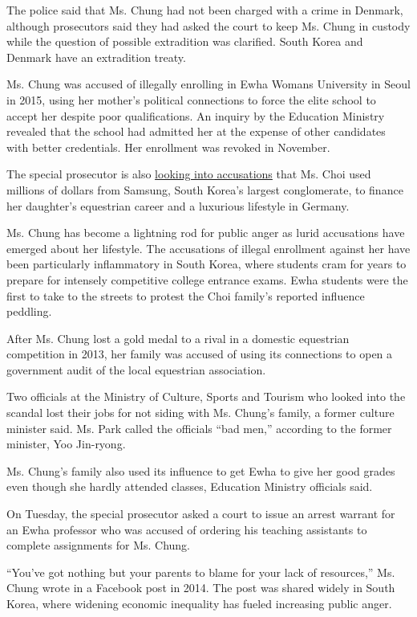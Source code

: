 The police said that Ms. Chung had not been charged with a crime in
Denmark, although prosecutors said they had asked the court to keep Ms.
Chung in custody while the question of possible extradition was
clarified. South Korea and Denmark have an extradition treaty.

Ms. Chung was accused of illegally enrolling in Ewha Womans University
in Seoul in 2015, using her mother's political connections to force the
elite school to accept her despite poor qualifications. An inquiry by
the Education Ministry revealed that the school had admitted her at the
expense of other candidates with better credentials. Her enrollment was
revoked in November.

The special prosecutor is also
\href{http://www.nytimes.com/2016/12/31/world/asia/south-korea-samsung-merger-moon-hyung-pyo.html}{looking
into accusations} that Ms. Choi used millions of dollars from Samsung,
South Korea's largest conglomerate, to finance her daughter's equestrian
career and a luxurious lifestyle in Germany.

Ms. Chung has become a lightning rod for public anger as lurid
accusations have emerged about her lifestyle. The accusations of illegal
enrollment against her have been particularly inflammatory in South
Korea, where students cram for years to prepare for intensely
competitive college entrance exams. Ewha students were the first to take
to the streets to protest the Choi family's reported influence peddling.

After Ms. Chung lost a gold medal to a rival in a domestic equestrian
competition in 2013, her family was accused of using its connections to
open a government audit of the local equestrian association.

Two officials at the Ministry of Culture, Sports and Tourism who looked
into the scandal lost their jobs for not siding with Ms. Chung's family,
a former culture minister said. Ms. Park called the officials ``bad
men,'' according to the former minister, Yoo Jin-ryong.

Ms. Chung's family also used its influence to get Ewha to give her good
grades even though she hardly attended classes, Education Ministry
officials said.

On Tuesday, the special prosecutor asked a court to issue an arrest
warrant for an Ewha professor who was accused of ordering his teaching
assistants to complete assignments for Ms. Chung.

``You've got nothing but your parents to blame for your lack of
resources,'' Ms. Chung wrote in a Facebook post in 2014. The post was
shared widely in South Korea, where widening economic inequality has
fueled increasing public anger.


